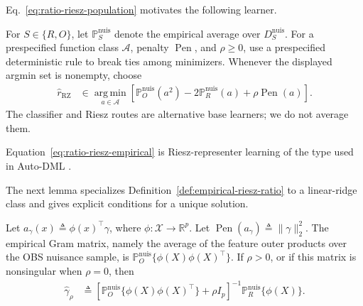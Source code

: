 Eq.~\eqref{eq:ratio-riesz-population} motivates the following learner.


\begin{definition}
\label{def:empirical-riesz-ratio}
	For $S\in\{R,O\}$, let $\mathbb P_S^{\mathrm{nuis}}$ denote the
	empirical average over $D_S^{\mathrm{nuis}}$. For a prespecified function class $\mathcal A$, penalty $\operatorname{Pen}$, and $\rho\geq0$, use a prespecified deterministic rule to break ties among minimizers. Whenever the displayed argmin set is nonempty, choose
	\begin{align}
		\widehat r_{\mathrm{RZ}}
		&\in
		\operatorname*{arg\,min}_{a\in\mathcal A}
		\left[
		\mathbb P_O^{\mathrm{nuis}}(a^2)-2\mathbb P_R^{\mathrm{nuis}}(a)
		+\rho\operatorname{Pen}(a)
		\right].
		\label{eq:ratio-riesz-empirical}
	\end{align}
	The classifier and Riesz routes are alternative base learners; we do not average them.
\end{definition}

Equation~\eqref{eq:ratio-riesz-empirical} is Riesz-representer learning of the type used in Auto-DML \citep{chernozhukov2021riesz,chernozhukov2022autodml}.

The next lemma specializes Definition~\ref{def:empirical-riesz-ratio} to a linear-ridge class and gives explicit conditions for a unique solution.
\begin{lemma}
\label{lem:linear-riesz-ratio}
Let $a_\gamma(x)\triangleq\phi(x)^\top\gamma$, where $\phi:\mathcal X\to\mathbb R^p$. Let $\operatorname{Pen}(a_\gamma)\triangleq\|\gamma\|_2^2$.
The empirical Gram matrix, namely the average of the feature outer products over the OBS nuisance sample, is $\mathbb P_O^{\mathrm{nuis}}\{\phi(X)\phi(X)^\top\}$. If $\rho>0$, or if this matrix is nonsingular when $\rho=0$, then
\begin{align}
	\widehat\gamma_\rho
	&\triangleq
	\left[
	\mathbb P_O^{\mathrm{nuis}}\{\phi(X)\phi(X)^\top\}+\rho I_p
	\right]^{-1}
	\mathbb P_R^{\mathrm{nuis}}\{\phi(X)\}.
	\label{eq:ratio-riesz-linear}
\end{align}
\end{lemma}

